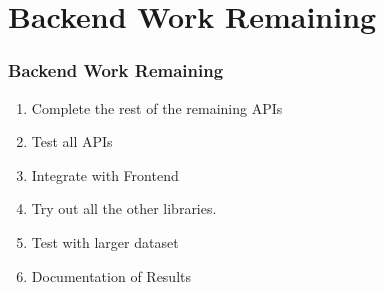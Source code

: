 \documentclass[aspectratio=169]{beamer}
\begin{document}
\section{Backend Work Remaining}
\begin{frame}
	\centering
	\frametitle{Backend Work Remaining}
	\begin{minipage}{0.95\textwidth}
		\begin{enumerate}
			\item Complete the rest of the remaining APIs
			\item Test all APIs
			\item Integrate with Frontend
			\item Try out all the other libraries.
			\item Test with larger dataset
			\item Documentation of Results
		\end{enumerate}
	\end{minipage}
\end{frame}
\end{document}
